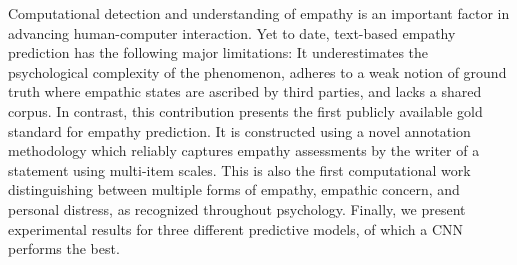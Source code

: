 Computational detection and understanding of empathy is an important factor in advancing human-computer interaction. Yet to date, text-based empathy prediction has the following major limitations: It underestimates the psychological complexity of the phenomenon, adheres to a weak notion of ground truth where empathic states are ascribed by third parties, and lacks a shared corpus. In contrast, this contribution presents the first publicly available gold standard for empathy prediction. It is constructed using a novel annotation methodology which reliably captures empathy assessments by the writer of a statement using multi-item scales. This is also the first computational work distinguishing between multiple forms of empathy, empathic concern, and personal distress, as recognized throughout psychology. Finally, we present experimental results for three different predictive models, of which a CNN performs the best.
